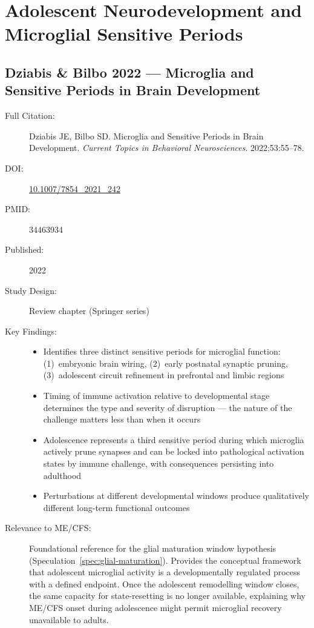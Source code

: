 \section{Adolescent Neurodevelopment and Microglial Sensitive Periods}
\label{sec:bib-microglial-development}

\subsection{Dziabis \& Bilbo 2022 --- Microglia and Sensitive Periods in Brain Development}

\begin{description}
    \item[Full Citation:] Dziabis JE, Bilbo SD. Microglia and Sensitive Periods in Brain Development. \textit{Current Topics in Behavioral Neurosciences}. 2022;53:55--78.
    \item[DOI:] \href{https://doi.org/10.1007/7854_2021_242}{10.1007/7854\_2021\_242}
    \item[PMID:] 34463934
    \item[Published:] 2022
    \item[Study Design:] Review chapter (Springer series)
    \item[Key Findings:]
    \begin{itemize}
        \item Identifies three distinct sensitive periods for microglial function: (1)~embryonic brain wiring, (2)~early postnatal synaptic pruning, (3)~adolescent circuit refinement in prefrontal and limbic regions
        \item Timing of immune activation relative to developmental stage determines the type and severity of disruption --- the nature of the challenge matters less than when it occurs
        \item Adolescence represents a third sensitive period during which microglia actively prune synapses and can be locked into pathological activation states by immune challenge, with consequences persisting into adulthood
        \item Perturbations at different developmental windows produce qualitatively different long-term functional outcomes
    \end{itemize}
    \item[Relevance to ME/CFS:] Foundational reference for the glial maturation window hypothesis (Speculation~\ref{spec:glial-maturation}). Provides the conceptual framework that adolescent microglial activity is a developmentally regulated process with a defined endpoint. Once the adolescent remodelling window closes, the same capacity for state-resetting is no longer available, explaining why ME/CFS onset during adolescence might permit microglial recovery unavailable to adults.

\end{description}
